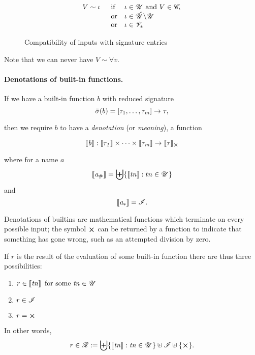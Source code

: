 \begin{figure}[H]
  \centering
  $$
  \begin{array}{lll}
  V \sim \iota \enspace & \mbox{if} & \iota \in \Uni \mbox{ and $V \in \Con{\iota}$}\\
     & \mbox{or} & \iota \in \Unihat \backslash \Uni \\ %
     & \mbox{or} & \iota \in \Var_*
  \end{array}
  $$
  \caption{Compatibility of inputs with signature entries}
  \label{fig:compatibility}
\end{figure}


\noindent Note that we can never have $V \sim \forall v$.

\paragraph{Denotations of built-in functions.}
If we have a built-in function $b$ with reduced signature
$$
      \bar{\sigma}(b) = [\tau_1, \ldots, \tau_m] \rightarrow \tau,
$$

then we require $b$ to have a \textit{denotation} (or \textit{meaning}), a function
      
$$
\denote{b}: \denote{\tau_1} \times \cdots \times \denote{\tau_m} \rightarrow \withError{\denote{\tau}}
$$

\noindent where for a name $a$
$$
\llbracket\mathit{a_\#}\rrbracket = \biguplus\{\llbracket\mathit{tn}\rrbracket: tn \in \mathscr{U}\}
$$
and
$$
\llbracket\mathit{a_*}\rrbracket = \mathscr{I}.
$$


Denotations of builtins are mathematical functions which terminate on every
possible input; the symbol $\errorX$ can be returned by a function to indicate
that something has gone wrong, such as an attempted division by zero.

\medskip\noindent
If $r$ is the result of the evaluation of some built-in function there are thus
three possibilities:
\begin{enumerate}
\item $r \in \llbracket\mathit{\mathit{tn}}\rrbracket \enspace \mbox{for some $\mathit{tn} \in \mathscr{U}$}$
\item $r \in \mathscr{I}$
\item $r = \errorX$
\end{enumerate}
In other words,
$$
r \in \R := \bigdisj\{\denote{\tn}: \tn \in \Uni \} \disj \Inputs \disj \{\errorX\}.
$$

